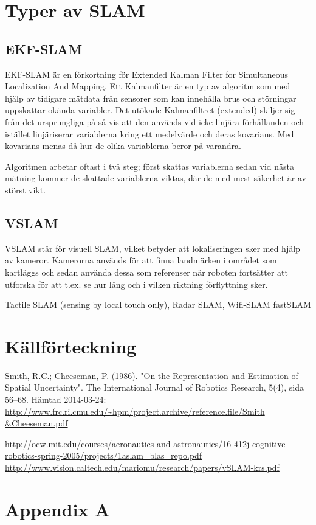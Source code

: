 \documentclass[a4paper,12pt,fleqn]{article} \usepackage{fixltx2e}
\begin{document}
\section{Typer av SLAM}

\subsection{EKF-SLAM} 
EKF-SLAM är en förkortning för Extended Kalman Filter for Simultaneous 
Localization And Mapping. Ett Kalmanfilter är en typ av algoritm som med hjälp av 
tidigare mätdata från sensorer som kan innehålla brus och störningar uppskattar okända variabler. 
Det utökade Kalmanfiltret (extended) skiljer sig från det ursprungliga på så vis att den används vid icke-linjära förhållanden 
och istället linjäriserar variablerna kring ett medelvärde och deras kovarians. Med kovarians menas då hur de olika variablerna beror på varandra.

Algoritmen arbetar oftast i två steg; först skattas variablerna sedan vid nästa mätning 
kommer de skattade variablerna viktas, där de med mest säkerhet är av störst vikt.

\subsection{VSLAM}

VSLAM står för visuell SLAM, vilket betyder att lokaliseringen sker med hjälp av kameror. Kamerorna används
för att finna landmärken i området som kartläggs och sedan använda dessa som referenser när roboten fortsätter att utforska
för att t.ex. se hur lång och i vilken riktning förflyttning sker.

 
Tactile SLAM (sensing by local touch only), Radar
SLAM, 
Wifi-SLAM 
fastSLAM

\newpage \section{Källförteckning} Smith, R.C.; Cheeseman, P. (1986).
"On the Representation and Estimation of Spatial Uncertainty". The
International Journal of Robotics Research, 5(4), sida 56–68. Hämtad
2014-03-24:
\url{http://www.frc.ri.cmu.edu/~hpm/project.archive/reference.file/Smith
&Cheeseman.pdf}

\url{http://ocw.mit.edu/courses/aeronautics-and-astronautics/16-412j-cognitive-robotics-spring-2005/projects/1aslam_blas_repo.pdf}
\url{http://www.vision.caltech.edu/mariomu/research/papers/vSLAM-krs.pdf}

% 
\newpage \appendix \pagestyle{empty}
 \section{Appendix A}
\end{document}
